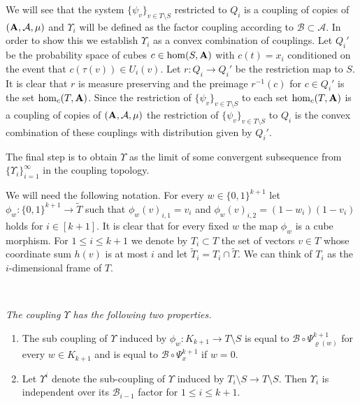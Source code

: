 \documentclass [11pt] {article}
\def\bA{{\bf A}}
\begin{document}
We will see that the system $\{\psi_v\}_{v\in T\setminus S}$ restricted to $Q_i$ is a coupling of copies of $(\bA,\mathcal{A},\mu)$ and $\Upsilon_i$ will be defined as the factor coupling according to $\mathcal{B}\subset\mathcal{A}$. 
In order to show this we establish $\Upsilon_i$ as a convex combination of couplings.
Let $Q_i'$ be the probability space of cubes $c\in\hom(S,\bA)$ with $c(t)=x_i$ conditioned on the event that $c(\tau(v))\in U_i(v)$. Let $r:Q_i\rightarrow Q_i'$ be the restriction map to $S$. It is clear that $r$ is measure preserving and the preimage $r^{-1}(c)$ for $c\in Q_i'$ is the set $\hom_c(T,\bA)$. Since the restriction of $\{\psi_v\}_{v\in T\setminus S}$ to each set $\hom_c(T,\bA)$ is a coupling of copies of $(\bA,\mathcal{A},\mu)$ the restriction of $\{\psi_v\}_{v\in T\setminus S}$ to $Q_i$ is the convex combination of these couplings with distribution given by $Q_i'$.

The final step is to obtain $\Upsilon$ as the limit of some convergent subsequence from $\{\Upsilon_i\}_{i=1}^\infty$ in the coupling topology. 




\medskip


We will need the following notation. For every $w\in\{0,1\}^{k+1}$ let $\phi_w:\{0,1\}^{k+1}\rightarrow \tilde{T}$ such that $\phi_w(v)_{i,1}=v_i$ and $\phi_w(v)_{i,2}=(1-w_i)(1-v_i)$ holds for $i\in [k+1]$. It is clear that for every fixed $w$ the map $\phi_w$ is a cube morphism. For $1\leq i\leq k+1$ we denote by $T_i\subset T$ the set of vectors $v\in T$ whose coordinate sum $h(v)$ is at most $i$ and let $\tilde{T}_i=T_i\cap\tilde{T}$. We can think of $T_i$ as the $i$-dimensional frame of $T$.

\medskip

~~{\it The coupling $\Upsilon$ has the following two properties.
\begin{enumerate}
\item The sub coupling of $\Upsilon$ induced by  $\phi_w:K_{k+1}\rightarrow T\setminus S$ is equal to $\mathcal{B}\circ\Psi_{\varrho(w)}^{k+1}$ for every $w\in K_{k+1}$ and is equal to $\mathcal{B}\circ\Psi_x^{k+1}$ if $w=0$.
\item Let $\Upsilon^i$ denote the sub-coupling of $\Upsilon$ induced by $T_i\setminus S\rightarrow T\setminus S$. Then $\Upsilon_i$ is independent over its $\mathcal{B}_{i-1}$ factor for $1\leq i\leq k+1$.
\end{enumerate}
}
\end{document}
